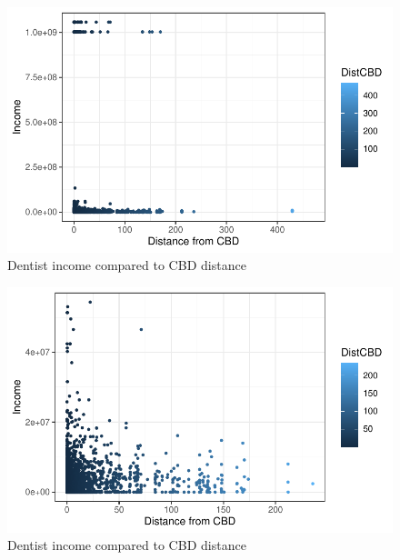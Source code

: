 \documentclass[
  10,
  a4paper,
]{article}
\begin{document}
\begin{figure}

{\centering \includegraphics{Retail-Agglomeration_abstract_introduction_theori_econometric_approach_files/figure-pdf/fig-2-1.pdf}

}

\caption{\label{fig-2}Dentist income compared to CBD distance}

\end{figure}

\begin{figure}

{\centering \includegraphics{Retail-Agglomeration_abstract_introduction_theori_econometric_approach_files/figure-pdf/fig-3-1.pdf}

}

\caption{\label{fig-3}Dentist income compared to CBD distance}

\end{figure}
\end{document}
